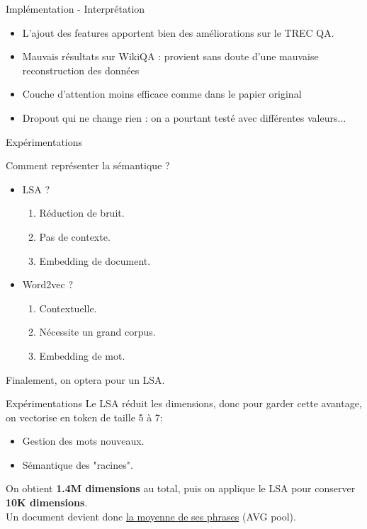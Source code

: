 \documentclass{beamer}
\begin{document}
\begin{frame}{Implémentation - Interprétation}
  \begin{itemize}
    \item L'ajout des features apportent bien des améliorations sur le TREC QA.
    \item Mauvais résultats sur WikiQA : provient sans doute d'une mauvaise reconstruction des données
    \item Couche d'attention moins efficace comme dans le papier original
    \item Dropout qui ne change rien : on a pourtant testé avec différentes valeurs...
  \end{itemize}
\end{frame}

	
	
\begin{frame}{Expérimentations}
    \begin{block}{Comment représenter la sémantique ?}
        \begin{itemize}
            \item LSA ?
            \begin{enumerate}
                \item Réduction de bruit.
                \item Pas de contexte.
                \item Embedding de document.
            \end{enumerate}
            \item Word2vec ?
            \begin{enumerate}
                \item Contextuelle.
                \item Nécessite un grand corpus.
                \item Embedding de mot.
            \end{enumerate}
        \end{itemize}
        
        Finalement, on optera pour un LSA.
    \end{block}
\end{frame}

\begin{frame}{Expérimentations}
    Le LSA réduit les dimensions, donc pour garder cette avantage, on vectorise en token de taille 5 à 7:
    \begin{itemize}
        \item Gestion des mots nouveaux.
        \item Sémantique des "racines".
    \end{itemize}
    On obtient \textbf{1.4M dimensions} au total, puis on applique le LSA pour conserver \textbf{10K dimensions}.\\
    Un document devient donc \underline{la moyenne de ses phrases} (AVG pool).
\end{frame}
\end{document}

